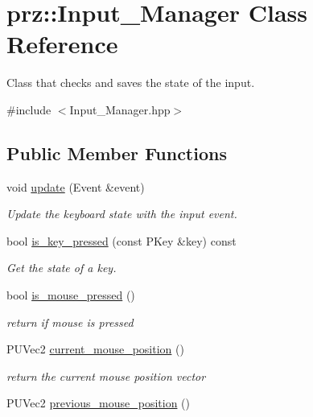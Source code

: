 \hypertarget{classprz_1_1_input___manager}{}\section{prz\+::Input\+\_\+\+Manager Class Reference}
\label{classprz_1_1_input___manager}


Class that checks and saves the state of the input.  




{\ttfamily \#include $<$Input\+\_\+\+Manager.\+hpp$>$}

\subsection*{Public Member Functions}
\begin{DoxyCompactItemize}
\item 
void \mbox{\hyperlink{classprz_1_1_input___manager_a4d1defd273c14ac8fd242514a95de019}{update}} (Event \&event)
\begin{DoxyCompactList}\small\item\em Update the keyboard state with the input event. \end{DoxyCompactList}\item 
bool \mbox{\hyperlink{classprz_1_1_input___manager_abaf16456e62dd4a4ab1fc7115f0a4988}{is\+\_\+key\+\_\+pressed}} (const P\+Key \&key) const
\begin{DoxyCompactList}\small\item\em Get the state of a key. \end{DoxyCompactList}\item 
bool \mbox{\hyperlink{classprz_1_1_input___manager_a038b61e13bb66fc5eaa2cfe613070057}{is\+\_\+mouse\+\_\+pressed}} ()
\begin{DoxyCompactList}\small\item\em return if mouse is pressed \end{DoxyCompactList}\item 
P\+U\+Vec2 \mbox{\hyperlink{classprz_1_1_input___manager_a05861231ed2b0b64154579cd3eced94a}{current\+\_\+mouse\+\_\+position}} ()
\begin{DoxyCompactList}\small\item\em return the current mouse position vector \end{DoxyCompactList}\item 
P\+U\+Vec2 \mbox{\hyperlink{classprz_1_1_input___manager_a77ba062e39f58eebe9c24ce4dab8fc58}{previous\+\_\+mouse\+\_\+position}} ()

\end{DoxyCompactItemize}
